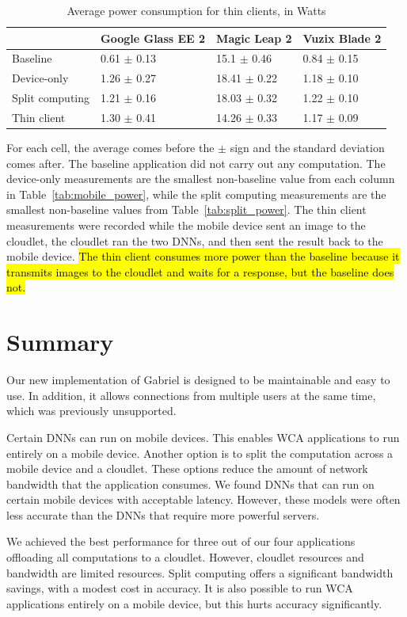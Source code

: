\begin{table}
\begin{tabular}{|l||l|l|l|}
  \hline
  & Google Glass EE 2 & Magic Leap 2 & Vuzix Blade 2\\
  \hline
  \hline
  Baseline & 0.61 $\pm$ 0.13 & 15.1 $\pm$ 0.46 & 0.84 $\pm$ 0.15\\
  Device-only & 1.26 $\pm$ 0.27 & 18.41 $\pm$ 0.22 & 1.18 $\pm$ 0.10\\
  Split computing & 1.21 $\pm$ 0.16 & 18.03 $\pm$ 0.32 & 1.22 $\pm$ 0.10\\
  Thin client & 1.30 $\pm$ 0.41 & 14.26 $\pm$ 0.33 & 1.17 $\pm$ 0.09\\
  \hline
\end{tabular}
\begin{captiontext}
    For each cell, the average comes before the $\pm$ sign and the standard
    deviation comes after.
    The baseline application did not carry out any computation.
    The device-only measurements are the smallest non-baseline value from
    each column in Table~\ref{tab:mobile_power}, while the split computing
    measurements are the smallest non-baseline values from
    Table~\ref{tab:split_power}.
    The thin client measurements were recorded while the mobile device sent an
    image to the cloudlet, the cloudlet ran the two DNNs, and then sent the
    result back to the mobile device.
    \hl{
      The thin client consumes more power than the baseline because it transmits
      images to the cloudlet and waits for a response, but the baseline does
      not.
    }
\end{captiontext}
  \caption{
    Average power consumption for thin clients, in Watts
  }\label{tab:thin_power}
\end{table}

\section{Summary}

Our new implementation of Gabriel is designed to be maintainable and easy to
use.
In addition, it allows connections from multiple users at the same time, which
was previously unsupported.

Certain DNNs can run on mobile devices.
This enables WCA applications to run entirely on a mobile device.
Another option is to split the computation across a mobile device and a
cloudlet.
These options reduce the amount of network bandwidth that the application
consumes.
We found DNNs that can run on certain mobile devices with acceptable latency.
However, these models were often less accurate than the DNNs that require more
powerful servers.

We achieved the best performance for three out of our four applications
offloading all computations to a cloudlet.
However, cloudlet resources and bandwidth are limited resources.
Split computing offers a significant bandwidth savings, with a modest cost in
accuracy.
It is also possible to run WCA applications entirely on a mobile device, but
this hurts accuracy significantly.
